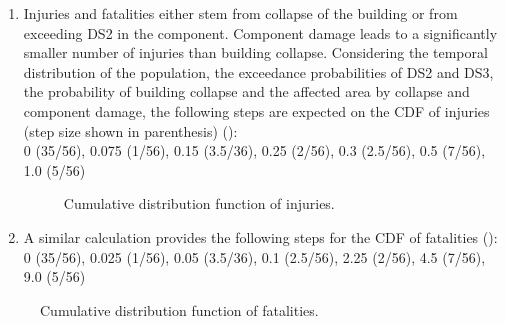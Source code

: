 \begin{enumerate}
    \item Injuries and fatalities either stem from collapse of the building or from exceeding DS2 in the component. Component damage leads to a significantly smaller number of injuries than building collapse. Considering the temporal distribution of the population, the exceedance probabilities of DS2 and DS3, the probability of building collapse and the affected area by collapse and component damage, the following steps are expected on the CDF of injuries (step size shown in parenthesis) ():\\
    0 (35/56), 0.075 (1/56), 0.15 (3.5/36), 0.25 (2/56), 0.3 (2.5/56), 0.5 (7/56), 1.0 (5/56)
    
\begin{figure}[!htbp]
  \caption{Cumulative distribution function of injuries.}
  \label{fig:ver_1_11}
\end{figure}

    \item A similar calculation provides the following steps for the CDF of fatalities ():\\
    0 (35/56), 0.025 (1/56), 0.05 (3.5/36), 0.1 (2.5/56), 2.25 (2/56), 4.5 (7/56), 9.0 (5/56)
\end{enumerate}

\begin{figure}[!htbp]
  \caption{Cumulative distribution function of fatalities.}
  \label{fig:ver_1_12}
\end{figure}